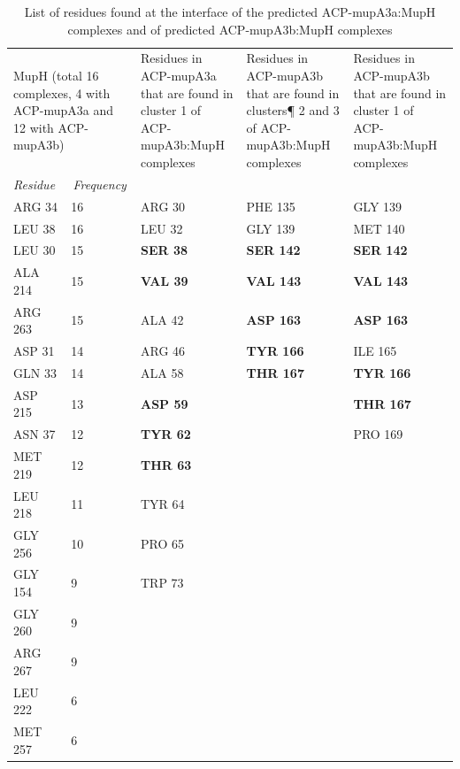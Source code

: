 			\begin{table}
			\begin{small}
			\caption{List of residues found at the interface of the predicted ACP-mupA3a:MupH complexes and of predicted ACP-mupA3b:MupH complexes}
			\label{tab: interface_res} 
			\begin{center}
			\begin{threeparttable}[b]
			\begin{tabular}{p{2cm} p{2cm} p{3.25cm} p{3.25cm} p{3.25cm}} \\
			\toprule[2pt]
			\multicolumn{ 2}{p{4cm}}{MupH (total 16 complexes, 4 with ACP-mupA3a and 12 with ACP-mupA3b)} & Residues in ACP-mupA3a that are found in cluster 1 of ACP-mupA3b:MupH complexes & Residues in ACP-mupA3b that are found in clusters¶ 2 and 3 of ACP-mupA3b:MupH complexes \tnote{a} & Residues in ACP-mupA3b that are found in cluster 1 of ACP-mupA3b:MupH complexes \tnote{b} \\ 
			\cmidrule[1pt]{1-2}
			\textit{Residue} & \multicolumn{1}{c}{\textit{Frequency}} &  &  &  \\
			\midrule[1pt]
			ARG 34 & 16 & ARG 30 & PHE 135 & GLY 139 \\
			LEU 38 & 16 & LEU 32 & GLY 139 & MET 140 \\ 
			LEU 30 & 15 & \textbf{SER 38} & \textbf{SER 142} & \textbf{SER 142} \\ 
			ALA 214 & 15 & \textbf{VAL 39} & \textbf{VAL 143} & \textbf{VAL 143} \\ 
			ARG 263 & 15 & ALA 42 & \textbf{ASP 163} & \textbf{ASP 163} \\ 
			ASP 31 & 14 & ARG 46 & \textbf{TYR 166} & ILE 165 \\ 
			GLN 33 & 14 & ALA 58 & \textbf{THR 167} & \textbf{TYR 166} \\
			ASP 215 & 13 & \textbf{ASP 59} &  & \textbf{THR 167} \\ 
			ASN 37 & 12 & \textbf{TYR 62} &  & PRO 169 \\ 
			MET 219 & 12 & \textbf{THR 63} &  &  \\
			LEU 218 & 11 & TYR 64 &  &  \\ 
			GLY 256 & 10 & PRO 65 &  &  \\ 
			GLY 154 & 9 & TRP 73 &  &  \\ 
			GLY 260 & 9 &  &  &  \\
			ARG 267 & 9 &  &  &  \\ 
			LEU 222 & 6 &  &  &  \\ 
			MET 257 & 6 &  &  &  \\ 

\end{tabular}
\end{threeparttable}
\end{center}
\end{small}
\end{table}
